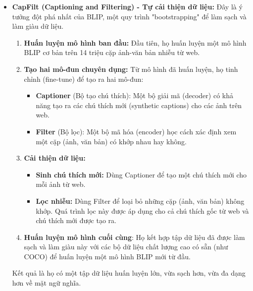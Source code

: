 \begin{itemize}
    \item \textbf{CapFilt (Captioning and Filtering) - Tự cải thiện dữ liệu:} Đây là ý tưởng đột phá nhất của BLIP, một quy trình "bootstrapping" để làm sạch và làm giàu dữ liệu.
    \begin{enumerate}
        \item \textbf{Huấn luyện mô hình ban đầu:} Đầu tiên, họ huấn luyện một mô hình BLIP cơ bản trên 14 triệu cặp ảnh-văn bản nhiễu từ web.
        \item \textbf{Tạo hai mô-đun chuyên dụng:} Từ mô hình đã huấn luyện, họ tinh chỉnh (fine-tune) để tạo ra hai mô-đun: 
        \begin{itemize}
            \item \textbf{Captioner} (Bộ tạo chú thích): Một bộ giải mã (decoder) có khả năng tạo ra các chú thích mới (synthetic captions) cho các ảnh trên web.
            \item \textbf{Filter} (Bộ lọc): Một bộ mã hóa (encoder) học cách xác định xem một cặp (ảnh, văn bản) có khớp nhau hay không.
        \end{itemize}
        \item \textbf{Cải thiện dữ liệu:}
        \begin{itemize}
            \item \textbf{Sinh chú thích mới:} Dùng Captioner để tạo một chú thích mới cho mỗi ảnh từ web.
            \item \textbf{Lọc nhiễu:} Dùng Filter để loại bỏ những cặp (ảnh, văn bản) không khớp. Quá trình lọc này được áp dụng cho cả chú thích gốc từ web và chú thích mới được tạo ra.
        \end{itemize}
        \item \textbf{Huấn luyện mô hình cuối cùng}: Họ kết hợp tập dữ liệu đã được làm sạch và làm giàu này với các bộ dữ liệu chất lượng cao có sẵn (như COCO) để huấn luyện một mô hình BLIP mới từ đầu.
    \end{enumerate}

    Kết quả là họ có một tập dữ liệu huấn luyện lớn, vừa sạch hơn, vừa đa dạng hơn về mặt ngữ nghĩa.


\end{itemize}
